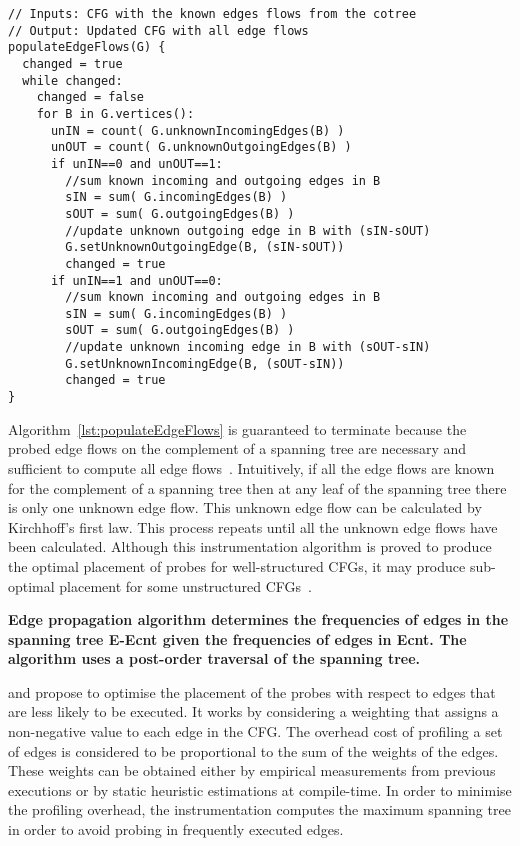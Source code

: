 \begin{lstlisting}[caption={A data-flow analysis for populating all edge flows based on the probed edges.}, label={lst:populateEdgeFlows}, float]
// Inputs: CFG with the known edges flows from the cotree
// Output: Updated CFG with all edge flows
populateEdgeFlows(G) {
  changed = true
  while changed:
    changed = false
    for B in G.vertices():
      unIN = count( G.unknownIncomingEdges(B) )
      unOUT = count( G.unknownOutgoingEdges(B) )
      if unIN==0 and unOUT==1:
        //sum known incoming and outgoing edges in B
        sIN = sum( G.incomingEdges(B) )
        sOUT = sum( G.outgoingEdges(B) )
        //update unknown outgoing edge in B with (sIN-sOUT)
        G.setUnknownOutgoingEdge(B, (sIN-sOUT))
        changed = true
      if unIN==1 and unOUT==0:
        //sum known incoming and outgoing edges in B
        sIN = sum( G.incomingEdges(B) )
        sOUT = sum( G.outgoingEdges(B) )
        //update unknown incoming edge in B with (sOUT-sIN)
        G.setUnknownIncomingEdge(B, (sOUT-sIN))
        changed = true
}
\end{lstlisting}

Algorithm~\ref{lst:populateEdgeFlows} is guaranteed to terminate because the probed edge flows on the complement of a spanning tree are necessary and sufficient to compute all edge flows~\citep{nahapetian73,forman81}.
Intuitively, if all the edge flows are known for the complement of a spanning tree then at any leaf of the spanning tree there is only one unknown edge flow.
This unknown edge flow can be calculated by Kirchhoff's first law.
This process repeats until all the unknown edge flows have been calculated.
Although this instrumentation algorithm is proved to produce the optimal placement of probes for well-structured CFGs, it may produce sub-optimal placement for some unstructured CFGs~\citep{ball94}.

\textbf{Edge propagation algorithm determines the frequencies of edges in the spanning tree E-Ecnt given the frequencies
of edges in Ecnt. The algorithm uses a post-order traversal of the spanning tree.}

\cite{forman81} and \cite{ball94} propose to optimise the placement of the probes with respect to edges that are less likely to be executed.
It works by considering a weighting that assigns a non-negative value to each edge in the CFG.
The overhead cost of profiling a set of edges is considered to be proportional to the sum of the weights of the edges.
These weights can be obtained either by empirical measurements from previous executions or by static heuristic estimations at compile-time.
In order to minimise the profiling overhead, the instrumentation computes the maximum spanning tree in order to avoid probing in frequently executed edges.


